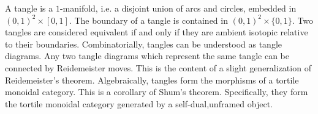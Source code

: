 \documentclass[12pt]{article}
\begin{document}
A tangle is a $1$-manifold, i.e. a disjoint union of arcs and circles, embedded in $(0,1)^{2}\times[0,1]$. The boundary of a tangle is contained in $(0,1)^{2}\times\{0,1\}$. Two tangles are considered equivalent if and only if they are ambient isotopic relative to their boundaries. Combinatorially, tangles can be understood as tangle diagrams. Any two tangle diagrams which represent the same tangle can be connected by Reidemeister moves. This is the content of a slight generalization of Reidemeister's theorem. Algebraically, tangles form the morphisms of a tortile monoidal category. This is a corollary of Shum's theorem. Specifically, they form the tortile monoidal category generated by a self-dual,unframed object.
\end{document}
